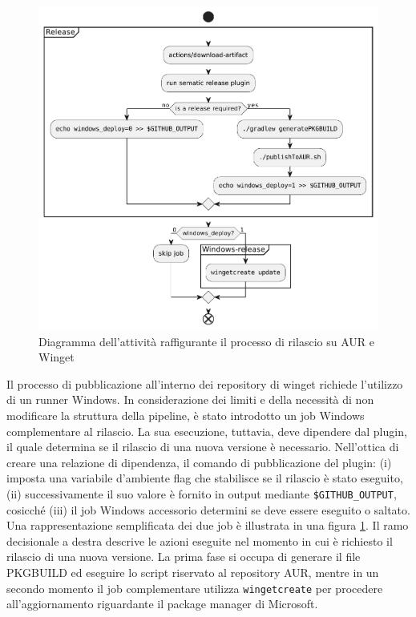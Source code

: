 \begin{figure}[htb]
	\centering
	\includegraphics[width=.95\linewidth]{figures/release-flow.pdf}
	\caption{Diagramma dell'attività raffigurante il processo di rilascio su AUR e Winget}
	\label{fig:release-flow}
\end{figure}

Il processo di pubblicazione all'interno dei repository di winget richiede l'utilizzo di un runner Windows. In considerazione dei limiti e della necessità di non modificare la struttura della pipeline, è stato introdotto un job Windows complementare al rilascio. La sua esecuzione, tuttavia, deve dipendere dal plugin, il quale determina se il rilascio di una nuova versione è necessario. Nell'ottica di creare una relazione di dipendenza, il comando di pubblicazione del plugin: (i) imposta una variabile d'ambiente flag che stabilisce se il rilascio è stato eseguito, (ii) successivamente il suo valore è fornito in output mediante \texttt{\$GITHUB\_OUTPUT}, cosicché (iii) il job Windows accessorio determini se deve essere eseguito o saltato. Una rappresentazione semplificata dei due job è illustrata in una figura \ref{fig:release-flow}. Il ramo decisionale a destra descrive le azioni eseguite nel momento in cui è richiesto il rilascio di una nuova versione. La prima fase si occupa di generare il file PKGBUILD ed eseguire lo script riservato al repository AUR, mentre in un secondo momento il job complementare utilizza \texttt{wingetcreate} per procedere all'aggiornamento riguardante il package manager di Microsoft.

